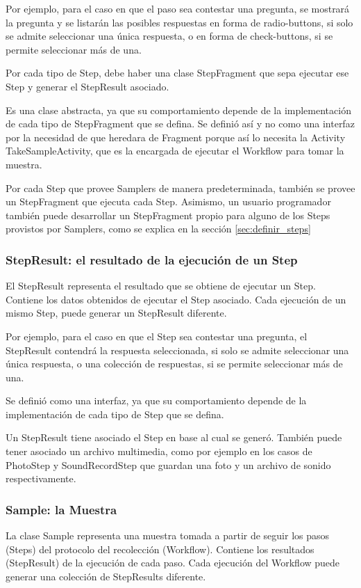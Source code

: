 Por ejemplo, para el caso en que el paso sea contestar una pregunta, se mostrará la pregunta y se listarán las posibles respuestas en forma de radio-buttons, si solo se admite seleccionar una única respuesta, o en forma de check-buttons, si se permite seleccionar más de una.

Por cada tipo de Step, debe haber una clase StepFragment que sepa ejecutar ese Step y generar el StepResult asociado.

Es una clase abstracta, ya que su comportamiento depende de la implementación de cada tipo de StepFragment que se defina. Se definió así y no como una interfaz por la necesidad de que heredara de Fragment porque así lo necesita la Activity TakeSampleActivity, que es la encargada de ejecutar el Workflow para tomar la muestra.

Por cada Step que provee Samplers de manera predeterminada, también se provee un StepFragment que ejecuta cada Step. Asimismo, un usuario programador también puede desarrollar un StepFragment propio para alguno de los Steps provistos por Samplers, como se explica en la sección \ref{sec:definir_steps}



\subsubsection{StepResult: el resultado de la ejecución de un Step}
El StepResult representa el resultado que se obtiene de ejecutar un Step. Contiene los datos obtenidos de ejecutar el Step asociado. Cada ejecución de un mismo Step, puede generar un StepResult diferente.

Por ejemplo, para el caso en que el Step sea contestar una pregunta, el StepResult contendrá la respuesta seleccionada, si solo se admite seleccionar una única respuesta, o una colección de respuestas, si se permite seleccionar más de una.

Se definió como una interfaz, ya que su comportamiento depende de la implementación de cada tipo de Step que se defina.

Un StepResult tiene asociado el Step en base al cual se generó. También puede tener asociado un archivo multimedia, como por ejemplo en los casos de PhotoStep y SoundRecordStep que guardan una foto y un archivo de sonido respectivamente.


\subsubsection{Sample: la Muestra}
La clase Sample representa una muestra tomada a partir de seguir los pasos (Steps) del protocolo del recolección (Workflow). Contiene los resultados (StepResult) de la ejecución de cada paso. Cada ejecución del Workflow puede generar una colección de StepResults diferente.


